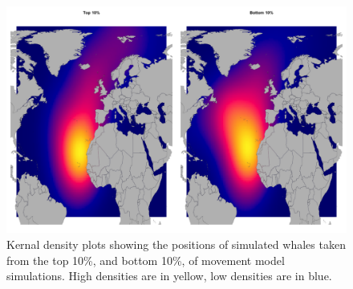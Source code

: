 \documentclass[a4paper,12pt]{article}
\begin{document}
\begin{landscape}
    \begin{figure}[!htbp]
    \centering
      \includegraphics[width=\linewidth]{figures/Figure-S8-kernals.png}
      \caption{Kernal density plots showing the positions of simulated whales taken from the top 10\%, and bottom 10\%, of movement model simulations. 
      High densities are in yellow, low densities are in blue.}
      \label{figs8}
  \end{figure}
\end{landscape}
 
\newpage


\end{document}
